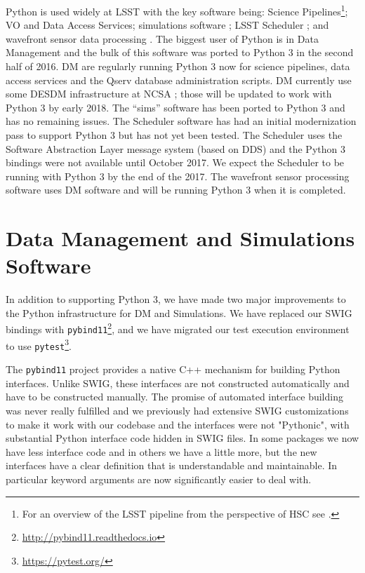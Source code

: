\documentclass[11pt,twoside]{article}
\begin{document}
Python is used widely at LSST with the key software being:
Science Pipelines\footnote{For an overview of the LSST pipeline from the perspective of HSC see \citet{2017arXiv170506766B}.};
VO and Data Access Services;
simulations software \citep{2014SPIE.9150E..14C};
LSST Scheduler \citep{2016SPIE.9910E..13D}; and
wavefront sensor data processing \citep{2016SPIE.9906E..3BT}.
The biggest user of Python is in Data Management \citep[DM;][]{O3-1_adassxxv} and the bulk of this software was ported to Python 3 in the second half of 2016.
DM are regularly running Python 3 now for science pipelines, data access services and the Qserv database administration scripts.
DM currently use some DESDM infrastructure at NCSA \citep{2012SPIE.8451E..0DM}; those will be updated to work with Python 3 by early 2018.
The ``sims'' software has been ported to Python 3 and has no remaining issues.
The Scheduler software has had an initial modernization pass to support Python 3 but has not yet been tested.
The Scheduler uses the Software Abstraction Layer \citep[SAL;][]{2016SPIE.9906E..5CM} message system (based on DDS) \citep{2016SPIE.9911E..25R} and the Python 3 bindings were not available until October 2017.
We expect the Scheduler to be running with Python 3 by the end of the 2017.
The wavefront sensor processing software uses DM software and will be running Python 3 when it is completed.

\section{Data Management and Simulations Software}

In addition to supporting Python 3, we have made two major improvements to the Python infrastructure for DM and Simulations.
We have replaced our SWIG bindings \citep{beazley2003automated} with \texttt{pybind11}\footnote{\url{http://pybind11.readthedocs.io}}, and we have migrated our test execution environment to use \texttt{pytest}\footnote{\url{https://pytest.org/}}.

The \texttt{pybind11} project provides a native C++ mechanism for building Python interfaces.
Unlike SWIG, these interfaces are not constructed automatically and have to be constructed manually.
The promise of automated interface building was never really fulfilled and we previously had extensive SWIG customizations to make it work with our codebase and the interfaces were not "Pythonic", with substantial Python interface code hidden in SWIG files.
In some packages we now have less interface code and in others we have a little more, but the new interfaces have a clear definition that is understandable and maintainable.
In particular keyword arguments are now significantly easier to deal with.
\end{document}
